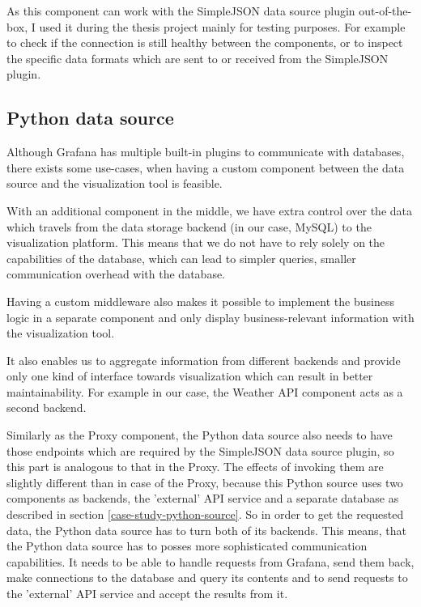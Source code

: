 As this component can work with the SimpleJSON data source plugin out-of-the-box, I used it during the thesis project mainly for testing purposes. For example to check if the connection is still healthy between the components, or to inspect the specific data formats which are sent to or received from the SimpleJSON plugin.

\subsection{Python data source}

Although Grafana has multiple built-in plugins to communicate with databases, there exists some use-cases, when having a custom component between the data source and the visualization tool is feasible.

With an additional component in the middle, we have extra control over the data which travels from the data storage backend (in our case, MySQL) to the visualization platform. This means that we do not have to rely solely on the capabilities of the database, which can lead to simpler queries, smaller communication overhead with the database.

Having a custom middleware also makes it possible to implement the business logic in a separate component and only display business-relevant information with the visualization tool.

It also enables us to aggregate information from different backends and provide only one kind of interface towards visualization which can result in better maintainability. For example in our case, the Weather API component acts as a second backend.

Similarly as the Proxy component, the Python data source also needs to have those endpoints which are required by the SimpleJSON data source plugin, so this part is analogous to that in the Proxy. The effects of invoking them are slightly different than in case of the Proxy, because this Python source uses two components as backends, the 'external' API service and a separate database as described in section \ref{case-study-python-source}. So in order to get the requested data, the Python data source has to turn both of its backends. This means, that the Python data source has to posses more sophisticated communication capabilities. It needs to be able to handle requests from Grafana, send them back, make connections to the database and query its contents and to send requests to the 'external' API service and accept the results from it.

